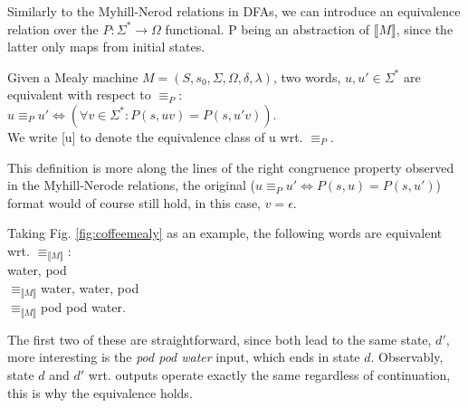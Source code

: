 Similarly to the Myhill-Nerod relations in DFAs, we can introduce an equivalence relation over the $P: \Sigma^*\to\Omega$ functional. P being an abstraction of $\llbracket M\rrbracket$, since the latter only maps from initial states.

\begin{definition}
	Given a Mealy machine $M=(S,s_{0},\Sigma,\Omega,\delta,\lambda) $, two words, $u, u'\in\Sigma^*$ are equivalent with respect to $\equiv_P$:\\
	$u \equiv_P u' \iff (\forall v\in\Sigma^*:P(s, uv) = P(s, u'v))$.\\
	We write [u] to denote the equivalence class of u wrt. $\equiv_P$.
\end{definition}

This definition is more along the lines of the right congruence property observed in the Myhill-Nerode relations, the original ($u \equiv_P u' \iff P(s, u) = P(s, u')$) format would of course still hold, in this case, $v = \epsilon$.

\begin{example}
	Taking Fig. \ref{fig:coffeemealy} as an example, the following words are equivalent wrt. $\equiv_{\llbracket M\rrbracket}$:\\
	\null\qquad\qquad\qquad\qquad\space water, pod\\
	\null\qquad\qquad$\equiv_{\llbracket M\rrbracket}$\qquad water, water, pod\\
	\null\qquad\qquad$\equiv_{\llbracket M\rrbracket}$\qquad pod pod water.
	
	The first two of these are straightforward, since both lead to the same state, $d'$, more interesting is the \textit{pod pod water} input, which ends in state $d$. Observably, state $d$ and $d'$ wrt. outputs operate exactly the same regardless of continuation, this is why the equivalence holds.
\end{example}

